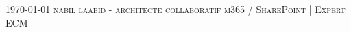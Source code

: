 \documentclass[localFont,alternative,10pt,compact]{yaac-another-awesome-cv}
\begin{document}
	\makecvheader

	\makecvfooter
		{\textsc{\today}} %
		{\textsc{nabil laabid - architecte collaboratif m365 / SharePoint | Expert ECM}} %
		{\thepage}

	
\end{document}
